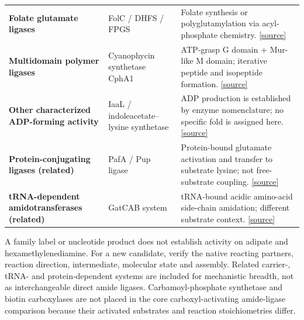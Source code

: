 \documentclass{article}
\begin{document}
\begin{tabularx}{\textwidth}{@{}>{\raggedright\arraybackslash}p{3.9in}>{\raggedright\arraybackslash}p{3.25in}Y@{}}
\textbf{Folate glutamate ligases} & FolC / DHFS / FPGS & Folate synthesis or polyglutamylation via acyl-phosphate chemistry. \href{https://journals.iucr.org/d/issues/2008/07/00/gx5127/gx5127.pdf}{[source]} \\[5pt]
\textbf{Multidomain polymer ligases} & Cyanophycin synthetase CphA1 & ATP-grasp G domain + Mur-like M domain; iterative peptide and isopeptide formation. \href{https://doi.org/10.1038/s41467-022-31542-7}{[source]} \\[5pt]
\textbf{Other characterized ADP-forming activity} & IaaL / indoleacetate--lysine synthetase & ADP production is established by enzyme nomenclature; no specific fold is assigned here. \href{https://iubmb.qmul.ac.uk/enzyme/EC6/3/2/20.html}{[source]} \\[5pt]
\textbf{Protein-conjugating ligases (related)} & PafA / Pup ligase & Protein-bound glutamate activation and transfer to substrate lysine; not free-substrate coupling. \href{https://pmc.ncbi.nlm.nih.gov/articles/PMC3039397/}{[source]} \\[5pt]
\textbf{tRNA-dependent amidotransferases (related)} & GatCAB system & tRNA-bound acidic amino-acid side-chain amidation; different substrate context. \href{https://pmc.ncbi.nlm.nih.gov/articles/PMC3039397/}{[source]} \\[5pt]
\bottomrule\end{tabularx}\par\vspace{13pt}
{\fontsize{13}{16}\selectfont A family label or nucleotide product does not establish activity on adipate and hexamethylenediamine. For a new candidate, verify the native reacting partners, reaction direction, intermediate, molecular state and assembly. Related carrier-, tRNA- and protein-dependent systems are included for mechanistic breadth, not as interchangeable direct amide ligases. Carbamoyl-phosphate synthetase and biotin carboxylases are not placed in the core carboxyl-activating amide-ligase comparison because their activated substrates and reaction stoichiometries differ.}
\end{document}
